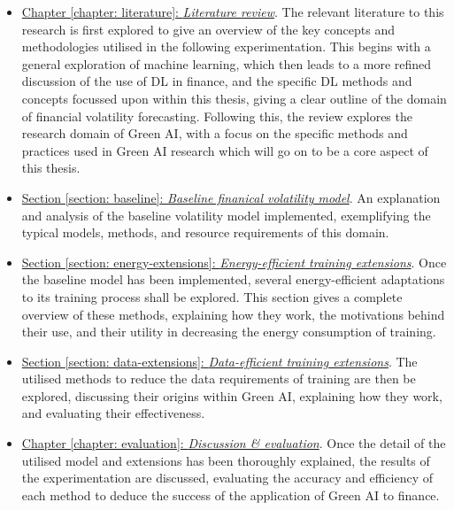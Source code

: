 \documentclass[a4paper, 11pt]{report}
\begin{document}
    \begin{itemize}
        \item \underline{Chapter \ref{chapter: literature}: \emph{Literature review}}. The relevant literature to this research is first explored to give an overview of the key concepts and methodologies utilised in the following experimentation. This begins with a general exploration of machine learning, which then leads to a more refined discussion of the use of DL in finance, and the specific DL methods and concepts focussed upon within this thesis, giving a clear outline of the domain of financial volatility forecasting. Following this, the review explores the research domain of Green AI, with a focus on the specific methods and practices used in Green AI research which will go on to be a core aspect of this thesis.
        
        \item \underline{Section \ref{section: baseline}: \emph{Baseline finanical volatility model}}. An explanation and analysis of the baseline volatility model implemented, exemplifying the typical models, methods, and resource requirements of this domain.

        \item \underline{Section \ref{section: energy-extensions}: \emph{Energy-efficient training extensions}}. Once the baseline model has been implemented, several energy-efficient adaptations to its training process shall be explored. This section gives a complete overview of these methods, explaining how they work, the motivations behind their use, and their utility in decreasing the energy consumption of training.
        
        \item \underline{Section \ref{section: data-extensions}: \emph{Data-efficient training extensions}}. The utilised methods to reduce the data requirements of training are then be explored, discussing their origins within Green AI, explaining how they work, and evaluating their effectiveness.
        
        \item \underline{Chapter \ref{chapter: evaluation}: \emph{Discussion \& evaluation}}. Once the detail of the utilised model and extensions has been thoroughly explained, the results of the experimentation are discussed, evaluating the accuracy and efficiency of each method to deduce the success of the application of Green AI to finance.
    \end{itemize}
\end{document}
